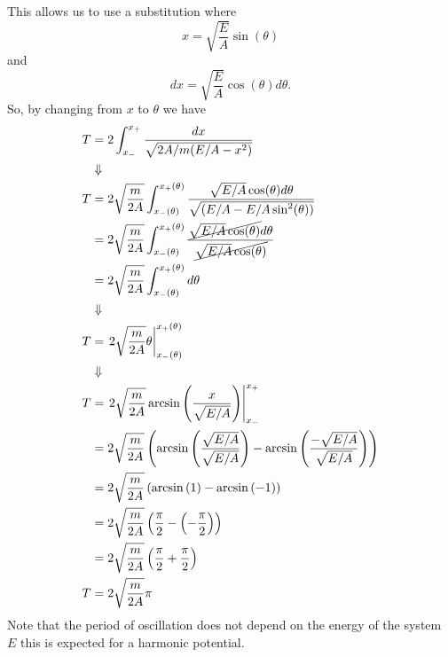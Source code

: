 \documentclass[11pt]{article}
\numberwithin{equation}{section}
\begin{document}
\begin{enumerate}[(a)]
This allows us to use a substitution where
$$x = \sqrt{\frac{E}{A}}\sin(\theta)$$
and 
$$dx = \sqrt{\frac{E}{A}}\cos(\theta)d\theta.$$
So, by changing from $x$ to $\theta$ we have
\begin{align*}
T &= 2\int_{x_-}^{x_+}\frac{dx}{\sqrt{2A/m(E/A-x^2)}}\\
&\Downarrow\\
T &= 2\sqrt{\frac{m}{2A}}\int_{x_-(\theta)}^{x_+(\theta)}\frac{\sqrt{E/A}\cos(\theta)d\theta}{\sqrt{(E/A-E/A\sin^2(\theta))}}\\
&= 2\sqrt{\frac{m}{2A}}\int_{x_-(\theta)}^{x_+(\theta)}\frac{\cancel{\sqrt{E/A}\cos(\theta)}d\theta}{\cancel{\sqrt{E/A}\cos(\theta)}}\\
&= 2\sqrt{\frac{m}{2A}}\int_{x_-(\theta)}^{x_+(\theta)} d\theta\\
&\Downarrow\\
T &= \left.2\sqrt{\frac{m}{2A}}\theta\right|_{x_-(\theta)}^{x_+(\theta)}\\
&\Downarrow\\
T &= \left.2\sqrt{\frac{m}{2A}}\arcsin\left(\frac{x}{\sqrt{E/A}}\right)\right|_{x_-}^{x_+}\\
&= 2\sqrt{\frac{m}{2A}}\left(\arcsin\left(\frac{\sqrt{E/A}}{\sqrt{E/A}}\right) - \arcsin\left(\frac{-\sqrt{E/A}}{\sqrt{E/A}}\right)\right)\\
&= 2\sqrt{\frac{m}{2A}}\left(\arcsin\left(1\right) - \arcsin\left(-1\right)\right)\\
&= 2\sqrt{\frac{m}{2A}}\left(\frac{\pi}{2} - \left(-\frac{\pi}{2}\right)\right)\\
&= 2\sqrt{\frac{m}{2A}}\left(\frac{\pi}{2} + \frac{\pi}{2}\right)\\
T &= 2\sqrt{\frac{m}{2A}}\pi
\end{align*}
Note that the period of oscillation does not depend on the energy of the system $E$ this is 
expected for a harmonic potential.


\end{enumerate}
\end{document}
